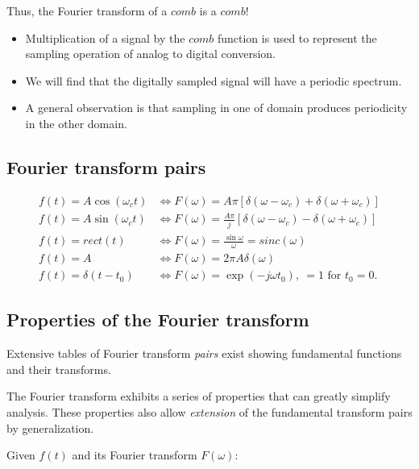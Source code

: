 \documentclass[11pt]{report}
\begin{document}
Thus, the Fourier transform of a $comb$ is a $comb$!
\begin{itemize}
\item Multiplication of a signal by the $comb$ function is used to represent
the sampling operation of analog to digital conversion.
\item We will find that the digitally sampled signal will have a periodic spectrum.
\item A general observation is that sampling in one of domain produces
periodicity in the other domain.
\end{itemize}

\subsection*{Fourier transform pairs}

\begin{equation*}
\begin{split}
f(t) = A\cos(\omega_c t) &\Longleftrightarrow F(\omega) = A\pi[\delta(\omega-\omega_c)+\delta(\omega+\omega_c)]\\
f(t) = A\sin(\omega_c t)&\Longleftrightarrow F(\omega) = \frac{A\pi}{j}[\delta(\omega-\omega_c)-\delta(\omega+\omega_c)]\\
f(t) = rect(t) &\Longleftrightarrow F(\omega) =
\frac{\sin\omega}{\omega} = sinc(\omega)\\
f(t) = A &\Longleftrightarrow F(\omega) = 2\pi A\delta(\omega)\\
f(t) = \delta(t-t_0) &\Longleftrightarrow F(\omega) = \exp(-j\omega
t_0),~ = 1 \text{ for } t_0 = 0.
\end{split}
\end{equation*}

\subsection*{Properties of the Fourier transform}

Extensive tables of Fourier transform \textit{pairs} exist showing
fundamental functions and their transforms.

The Fourier transform exhibits a series of properties that can greatly
simplify analysis.  These properties also allow \textit{extension} of the
fundamental transform pairs by generalization.

Given $f(t)$ and its Fourier transform $F(\omega)$:
\end{document}
